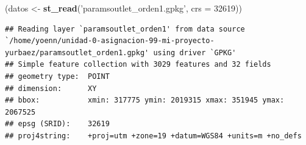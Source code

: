 \documentclass[11pt,]{article}
\newenvironment{Shaded}{\begin{snugshade}}{\end{snugshade}}
\newcommand{\KeywordTok}[1]{\textcolor[rgb]{0.13,0.29,0.53}{\textbf{#1}}}
\newcommand{\DataTypeTok}[1]{\textcolor[rgb]{0.13,0.29,0.53}{#1}}
\newcommand{\DecValTok}[1]{\textcolor[rgb]{0.00,0.00,0.81}{#1}}
\newcommand{\StringTok}[1]{\textcolor[rgb]{0.31,0.60,0.02}{#1}}
\newcommand{\NormalTok}[1]{#1}
\begin{document}
\begin{Shaded}
\begin{Highlighting}[]
\NormalTok{(datos <-}\StringTok{ }\KeywordTok{st_read}\NormalTok{(}\StringTok{'paramsoutlet_orden1.gpkg'}\NormalTok{, }\DataTypeTok{crs =} \DecValTok{32619}\NormalTok{))}
\end{Highlighting}
\end{Shaded}

\begin{verbatim}
## Reading layer `paramsoutlet_orden1' from data source `/home/yoenn/unidad-0-asignacion-99-mi-proyecto-yurbaez/paramsoutlet_orden1.gpkg' using driver `GPKG'
## Simple feature collection with 3029 features and 32 fields
## geometry type:  POINT
## dimension:      XY
## bbox:           xmin: 317775 ymin: 2019315 xmax: 351945 ymax: 2067525
## epsg (SRID):    32619
## proj4string:    +proj=utm +zone=19 +datum=WGS84 +units=m +no_defs
\end{verbatim}
\end{document}
